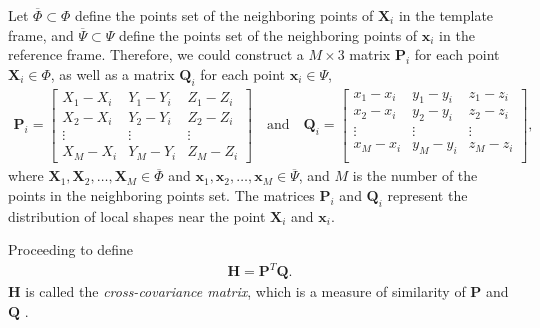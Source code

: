 \documentclass{llncs}
\begin{document}
Let $\overline{\Phi} \subset \Phi$ define the points set of the neighboring points of $\mathbf{X}_i$ in the template frame, and $\overline{\Psi} \subset \Psi$ define the points set of the neighboring points of $\mathbf{x}_i$ in the reference frame. Therefore, we could construct a $M \times 3$ matrix $\mathbf{P}_i$ for each point $\mathbf{X}_i \in \Phi$, as well as a matrix $\mathbf{Q}_i$ for each point $\mathbf{x}_i \in \Psi$,
\begin{align}
\mathbf{P}_i=
  \begin{bmatrix}
    X_1-X_i & Y_1-Y_i & Z_1-Z_i  \\
    X_2-X_i & Y_2-Y_i & Z_2-Z_i  \\
    \vdots & \vdots & \vdots \\
    X_M-X_i & Y_M-Y_i & Z_M-Z_i 
  \end{bmatrix} 
\quad \mbox{and} \quad 
 \mathbf{Q}_i=
  \begin{bmatrix}
    x_1-x_i & y_1-y_i & z_1-z_i  \\
    x_2-x_i & y_2-y_i & z_2-z_i  \\
    \vdots & \vdots & \vdots \\
    x_M-x_i & y_M-y_i & z_M-z_i  \\
  \end{bmatrix},
\end{align}
where $\mathbf{X}_1,\mathbf{X}_2,\dots,\mathbf{X}_M \in \overline{\Phi}$ and $\mathbf{x}_1,\mathbf{x}_2,\dots,\mathbf{x}_M \in \overline{\Psi}$, and $M$ is the number of the points in the neighboring points set. The matrices $\mathbf{P}_i$ and $\mathbf{Q}_i$ represent the distribution of local shapes near the point $\mathbf{X}_i$ and $\mathbf{x}_i$.

Proceeding to define
\begin{align}
\mathbf{H} = \mathbf{P}^T \mathbf{Q}.
\end{align}
$\mathbf{H}$ is called the \emph{cross-covariance matrix}, which is a measure of similarity of $\mathbf{P}$ and $\mathbf{Q}$ \cite{park2017fundamentals}. 
\end{document}
